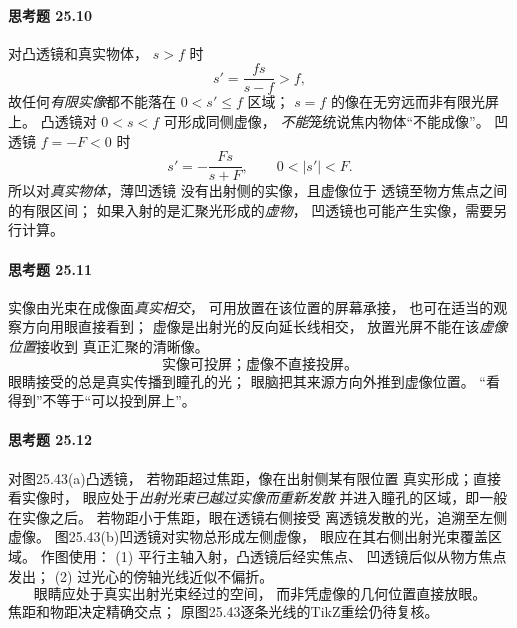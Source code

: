 \paragraph{思考题 25.10}
对凸透镜和真实物体，
\(s>f\) 时
\[
s'=\frac{fs}{s-f}>f,
\]
故任何\emph{有限实像}都不能落在
\(\boxed{0<s'\le f}\) 区域；
\(s=f\) 的像在无穷远而非有限光屏上。
凸透镜对 \(0<s<f\) 可形成同侧虚像，
\emph{不能}笼统说焦内物体“不能成像”。
凹透镜 \(f=-F<0\) 时
\[
s'=-\frac{Fs}{s+F},
\qquad 0<|s'|<F.
\]
所以对\emph{真实物体}，薄凹透镜
没有出射侧的实像，且虚像位于
透镜至物方焦点之间的有限区间；
如果入射的是汇聚光形成的\emph{虚物}，
凹透镜也可能产生实像，需要另行计算。

\paragraph{思考题 25.11}
实像由光束在成像面\emph{真实相交}，
可用放置在该位置的屏幕承接，
也可在适当的观察方向用眼直接看到；
虚像是出射光的反向延长线相交，
放置光屏不能在该\emph{虚像位置}接收到
真正汇聚的清晰像。
\[
\boxed{\text{实像可投屏；虚像不直接投屏。}}
\]
眼睛接受的总是真实传播到瞳孔的光；
眼脑把其来源方向外推到虚像位置。
“看得到”不等于“可以投到屏上”。

\paragraph{思考题 25.12}
对图25.43(a)凸透镜，
若物距超过焦距，像在出射侧某有限位置
真实形成；直接看实像时，
眼应处于\emph{出射光束已越过实像而重新发散}
并进入瞳孔的区域，即一般在实像之后。
若物距小于焦距，眼在透镜右侧接受
离透镜发散的光，追溯至左侧虚像。
图25.43(b)凹透镜对实物总形成左侧虚像，
眼应在其右侧出射光束覆盖区域。
作图使用：
(1) 平行主轴入射，凸透镜后经实焦点、
凹透镜后似从物方焦点发出；
(2) 过光心的傍轴光线近似不偏折。
\[
\boxed{\text{眼睛应处于真实出射光束经过的空间，
而非凭虚像的几何位置直接放眼。}}
\]
焦距和物距决定精确交点；
原图25.43逐条光线的TikZ重绘仍待复核。
